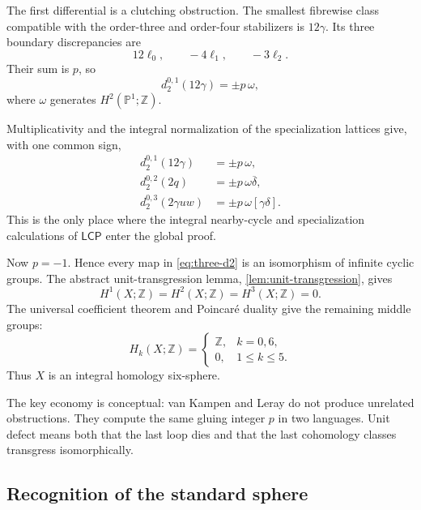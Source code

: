 \documentclass[11pt,reqno]{amsart}
\numberwithin{equation}{section}
\newcommand{\Z}{\mathbb Z}
\newcommand{\Pone}{\mathbb P^1}
\newcommand{\LCP}{\mathsf{LCP}}
\theoremstyle{definition}
\begin{document}
The first differential is a clutching obstruction. The smallest fibrewise class compatible with the order-three and order-four stabilizers is $12\gamma$. Its three boundary discrepancies are
\[
12\ell_0,
\qquad
-4\ell_1,
\qquad
-3\ell_2.
\]
Their sum is $p$, so
\begin{equation}\label{eq:first-d2}
d_2^{0,1}(12\gamma)=\pm p\,\omega,
\end{equation}
where $\omega$ generates $H^2(\Pone;\Z)$.

Multiplicativity and the integral normalization of the specialization lattices give, with one common sign,
\begin{equation}\label{eq:three-d2}
\begin{aligned}
d_2^{0,1}(12\gamma)&=\pm p\,\omega,\\
d_2^{0,2}(2q)&=\pm p\,\omega\overline\delta,\\
d_2^{0,3}(2\gamma uw)&=\pm p\,\omega[\gamma\delta].
\end{aligned}
\end{equation}
This is the only place where the integral nearby-cycle and specialization calculations of $\LCP$ enter the global proof.

Now $p=-1$. Hence every map in \cref{eq:three-d2} is an isomorphism of infinite cyclic groups. The abstract unit-transgression lemma, \cref{lem:unit-transgression}, gives
\begin{equation}\label{eq:lowcohomology}
H^1(X;\Z)=H^2(X;\Z)=H^3(X;\Z)=0.
\end{equation}
The universal coefficient theorem and Poincar\'e duality give the remaining middle groups:
\begin{equation}\label{eq:homology-sphere}
H_k(X;\Z)=
\begin{cases}
\Z,&k=0,6,\\
0,&1\leq k\leq5.
\end{cases}
\end{equation}
Thus $X$ is an integral homology six-sphere.

The key economy is conceptual: van Kampen and Leray do not produce unrelated obstructions. They compute the same gluing integer $p$ in two languages. Unit defect means both that the last loop dies and that the last cohomology classes transgress isomorphically.

\subsection{Recognition of the standard sphere}
\end{document}

